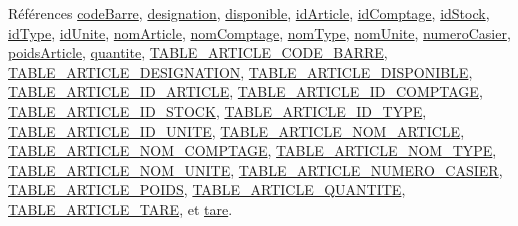 Références \hyperlink{_article_8h_source_l00090}{code\+Barre}, \hyperlink{_article_8h_source_l00091}{designation}, \hyperlink{_article_8h_source_l00093}{disponible}, \hyperlink{_article_8h_source_l00084}{id\+Article}, \hyperlink{_article_8h_source_l00088}{id\+Comptage}, \hyperlink{_article_8h_source_l00083}{id\+Stock}, \hyperlink{_article_8h_source_l00086}{id\+Type}, \hyperlink{_article_8h_source_l00096}{id\+Unite}, \hyperlink{_article_8h_source_l00085}{nom\+Article}, \hyperlink{_article_8h_source_l00089}{nom\+Comptage}, \hyperlink{_article_8h_source_l00087}{nom\+Type}, \hyperlink{_article_8h_source_l00097}{nom\+Unite}, \hyperlink{_article_8h_source_l00098}{numero\+Casier}, \hyperlink{_article_8h_source_l00094}{poids\+Article}, \hyperlink{_article_8h_source_l00092}{quantite}, \hyperlink{_article_8h_source_l00038}{T\+A\+B\+L\+E\+\_\+\+A\+R\+T\+I\+C\+L\+E\+\_\+\+C\+O\+D\+E\+\_\+\+B\+A\+R\+RE}, \hyperlink{_article_8h_source_l00039}{T\+A\+B\+L\+E\+\_\+\+A\+R\+T\+I\+C\+L\+E\+\_\+\+D\+E\+S\+I\+G\+N\+A\+T\+I\+ON}, \hyperlink{_article_8h_source_l00041}{T\+A\+B\+L\+E\+\_\+\+A\+R\+T\+I\+C\+L\+E\+\_\+\+D\+I\+S\+P\+O\+N\+I\+B\+LE}, \hyperlink{_article_8h_source_l00032}{T\+A\+B\+L\+E\+\_\+\+A\+R\+T\+I\+C\+L\+E\+\_\+\+I\+D\+\_\+\+A\+R\+T\+I\+C\+LE}, \hyperlink{_article_8h_source_l00036}{T\+A\+B\+L\+E\+\_\+\+A\+R\+T\+I\+C\+L\+E\+\_\+\+I\+D\+\_\+\+C\+O\+M\+P\+T\+A\+GE}, \hyperlink{_article_8h_source_l00031}{T\+A\+B\+L\+E\+\_\+\+A\+R\+T\+I\+C\+L\+E\+\_\+\+I\+D\+\_\+\+S\+T\+O\+CK}, \hyperlink{_article_8h_source_l00034}{T\+A\+B\+L\+E\+\_\+\+A\+R\+T\+I\+C\+L\+E\+\_\+\+I\+D\+\_\+\+T\+Y\+PE}, \hyperlink{_article_8h_source_l00044}{T\+A\+B\+L\+E\+\_\+\+A\+R\+T\+I\+C\+L\+E\+\_\+\+I\+D\+\_\+\+U\+N\+I\+TE}, \hyperlink{_article_8h_source_l00033}{T\+A\+B\+L\+E\+\_\+\+A\+R\+T\+I\+C\+L\+E\+\_\+\+N\+O\+M\+\_\+\+A\+R\+T\+I\+C\+LE}, \hyperlink{_article_8h_source_l00037}{T\+A\+B\+L\+E\+\_\+\+A\+R\+T\+I\+C\+L\+E\+\_\+\+N\+O\+M\+\_\+\+C\+O\+M\+P\+T\+A\+GE}, \hyperlink{_article_8h_source_l00035}{T\+A\+B\+L\+E\+\_\+\+A\+R\+T\+I\+C\+L\+E\+\_\+\+N\+O\+M\+\_\+\+T\+Y\+PE}, \hyperlink{_article_8h_source_l00045}{T\+A\+B\+L\+E\+\_\+\+A\+R\+T\+I\+C\+L\+E\+\_\+\+N\+O\+M\+\_\+\+U\+N\+I\+TE}, \hyperlink{_article_8h_source_l00046}{T\+A\+B\+L\+E\+\_\+\+A\+R\+T\+I\+C\+L\+E\+\_\+\+N\+U\+M\+E\+R\+O\+\_\+\+C\+A\+S\+I\+ER}, \hyperlink{_article_8h_source_l00042}{T\+A\+B\+L\+E\+\_\+\+A\+R\+T\+I\+C\+L\+E\+\_\+\+P\+O\+I\+DS}, \hyperlink{_article_8h_source_l00040}{T\+A\+B\+L\+E\+\_\+\+A\+R\+T\+I\+C\+L\+E\+\_\+\+Q\+U\+A\+N\+T\+I\+TE}, \hyperlink{_article_8h_source_l00043}{T\+A\+B\+L\+E\+\_\+\+A\+R\+T\+I\+C\+L\+E\+\_\+\+T\+A\+RE}, et \hyperlink{_article_8h_source_l00095}{tare}.



